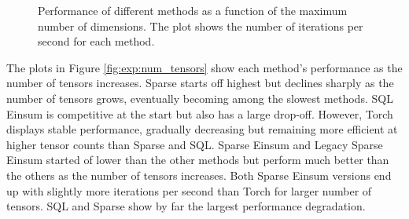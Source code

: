 \begin{figure}[H]
    \caption{Performance of different methods as a function of the maximum number of 
    dimensions. The plot shows the number of iterations per second for each method.}
    \label{fig:exp:max_num_dim}
\end{figure}

\noindent
The plots in Figure \ref{fig:exp:num_tensors} show each method's performance as the number 
of tensors increases. Sparse starts off highest but declines sharply as the number of tensors 
grows, eventually becoming among the slowest methods. SQL Einsum is competitive at the start 
but also has a large drop-off. However, Torch displays stable performance, gradually 
decreasing but remaining more efficient at higher tensor counts than Sparse and SQL. 
Sparse Einsum and Legacy Sparse Einsum started of lower than the other methods but perform 
much better than the others as the number of tensors increases. Both Sparse Einsum versions 
end up with slightly more iterations per second than Torch for larger number of tensors. 
SQL and Sparse show by far the largest performance degradation.

